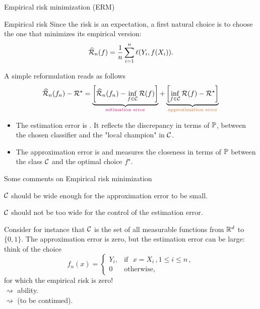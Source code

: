 \documentclass[xcolor={usenames,dvipsnames},handout]{beamer}
\begin{document}
\begin{frame}{Empirical risk minimization (ERM)}
\begin{exampleblock}{Empirical risk}
Since the risk is an expectation, a first natural choice is to choose the one that minimizes its empirical version:
$$
\widehat{\Rc}_n (f) = \frac{1}{n} \sum_{i=1}^n \ell (Y_i, f(X_i)).
$$
\end{exampleblock}
\pause
 A simple reformulation reads as follows
 $$
 \widehat{\Rc}_n(f_n) - \Rc^\star = \underbrace{\left[ \widehat{\Rc}_n(f_n) - \inf_{f\in \Cc} \Rc(f) \right]}_{\color{WildStrawberry}\text{estimation error}}+ \underbrace{\left[\inf_{f\in \Cc} \Rc(f) - \Rc^\star \right]}_{\color{Orange}\text{approximation error}}
 $$
 \pause
 {\small
 \begin{itemize}
 \item  The estimation error is . It reflects the discrepancy in terms of $\P$, between the chosen classifier and the "local champion" in $\Cc$.
\item The approximation error is  and measures the closeness in terms of $\P$ between the class $\Cc$ and the optimal choice $f^\star$.
\end{itemize}
}
\end{frame}
 

 

 

\begin{frame}{Some comments on Empirical risk minimization}

$\Cc$ should \alert{be wide enough for the approximation error to be small}.

\vspace{.2cm}

$\Cc$ should not be \alert{too wide for the control of the estimation error}.

\vspace{.3cm}

Consider for instance that $\Cc$ is the set of all measurable functions from $\R^d$ to $\{0,1\}$. 
The approximation error is zero, but the estimation error can be large: think of the choice
$$
f_n(x) = \left\{
\begin{array}{ll}
Y_i,  & \text{if } \, \,  x= X_i\,, 1\leq i \leq n\,, \\
0 & \text{otherwise},
\end{array}
\right.
$$
for which the empirical risk is zero! \\
$\rightsquigarrow$  ability. \\
$\rightsquigarrow$  (to be continued).
\end{frame}
\end{document}
